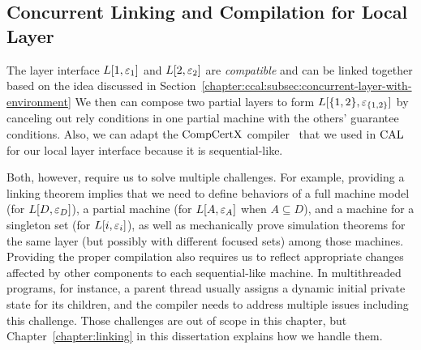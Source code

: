 \subsection{Concurrent Linking and Compilation for Local Layer}
\label{chapter:ccal:subsec:concurrent-linking-and compilation-for-local-layer}

The layer interface $L[1, {\varepsilon}_1]$ and $L[2, {\varepsilon}_2]$ are  {\em compatible} and can be linked together based on
the idea discussed in Section~\ref{chapter:ccal:subsec:concurrent-layer-with-environment}
We then can compose two partial layers to form 
$L[\{1, 2\}, {\varepsilon}_{\{1, 2\}}]$ by canceling out rely conditions in one partial machine with the others' guarantee conditions.
Also, we can adapt the $\mathrm{CompCertX}$ compiler~\cite{deepspec} that we used in $\mathrm{CAL}$
for our local layer interface because it is sequential-like.

Both, however, require us to solve multiple challenges. 
For example, providing a linking theorem  
implies that we need to define behaviors of a full machine model (for $L[D, {\varepsilon}_{D}]$), a partial machine (for $L[A, {\varepsilon}_{A}]$ when $A \subseteq D$), and 
a machine for a singleton set (for $L[i, {\varepsilon}_{i}]$), as well as mechanically prove simulation theorems for the same layer (but possibly with different focused sets) among those machines. 
Providing the proper compilation also requires 
us to reflect appropriate changes affected by other components to each sequential-like machine.
In multithreaded programs, for instance, a parent thread usually assigns a dynamic initial private state for its children,
and the compiler needs to address multiple issues including this challenge. 
Those challenges are out of scope in this chapter, but Chapter~\ref{chapter:linking} in this dissertation explains how we handle them.
